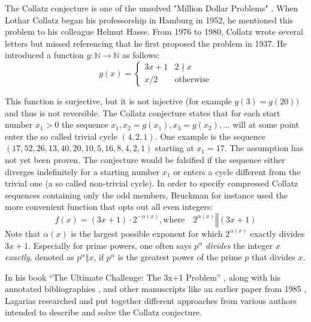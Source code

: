 The Collatz conjecture is one of the unsolved "Million Dollar Problems" \cite{Ref_Williams_2000}. When Lothar Collatz began his professorship in Hamburg in 1952, he mentioned this problem to his colleague Helmut Hasse. From 1976 to 1980, Collatz wrote several letters but missed referencing that he first proposed the problem in 1937. He introduced a function $g:\mathbb{N}\rightarrow\mathbb{N}$ as follows:
\begin{equation}
\label{eq:func_collatz}
g(x)=
\begin{cases}
3x+1	&	2\nmid x\\
x/2		&	\text{otherwise}
\end{cases}
\end{equation}

This function is surjective, but it is not injective (for example $g(3)=g(20))$ and thus is not reversible. The Collatz conjecture states that for each start number $x_1>0$ the sequence $x_1,x_2=g(x_1),x_3=g(x_2),\ldots$ will at some point enter the so called trivial cycle $(4,2,1)$. One example is the sequence $(17,52,26,13,40,20,10,5,16,8,4,2,1)$ starting at $x_1=17$. The assumption has not yet been proven. The conjecture would be falsified if the sequence either diverges indefinitely for a starting number $x_1$ or enters a cycle different from the trivial one (a so called non-trivial cycle). In order to specify compressed Collatz sequences containing only the odd members, Bruckman \cite{Ref_Bruckman_2008} for instance used the more convenient function that opts out all even integers:
\begin{equation}
\label{eq:func_collatz_odd}
f(x)=(3x+1)\cdot2^{-\alpha(x)},\text{where}\hspace{1em}2^{\alpha(x)}\mathrel\Vert(3x+1)
\end{equation}
Note that $\alpha(x)$ is the largest possible exponent for which $2^{\alpha(x)}$ exactly divides $3x+1$. Especially for prime powers, one often says $p^\alpha$ \textit{divides} the integer $x$ \textit{exactly}, denoted as $p^\alpha\mathrel\Vert x$, if $p^\alpha$ is the greatest power of the prime $p$ that divides $x$.

In his book “The Ultimate Challenge: The 3x+1 Problem” \cite{Ref_Lagarias_2010}, along with his annotated bibliographies \cite{Ref_Lagarias_2011}, \cite{Ref_Lagarias_2012} and other manuscripts like an earlier paper from 1985 \cite{Ref_Lagarias_1985}, Lagarias researched and put together different approaches from various authors intended to describe and solve the Collatz conjecture.

